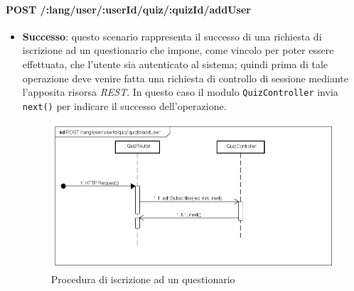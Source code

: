 \paragraph{POST /:lang/user/:userId/quiz/:quizId/addUser} %
\begin{itemize}
\item \textbf{Successo}: questo scenario rappresenta il successo di una richiesta di iscrizione ad un questionario che impone, come vincolo per poter essere effettuata, che l'utente sia autenticato al sistema; quindi prima di tale operazione deve venire fatta una richiesta di controllo di sessione mediante l'apposita risorsa \textit{REST}. In questo caso il modulo \texttt{QuizController} invia \texttt{next()} per indicare il successo dell'operazione.
\label{Procedura di iscrizione ad un questionario}
\begin{figure}[ht]
	\centering
	\includegraphics[scale=0.50]{UML/DiagrammiDiSequenza/Back-end/POST__lang_user_userId_quiz_quizId_addUser_success.png}
	\caption{Procedura di iscrizione ad un questionario}
\end{figure}
\FloatBarrier


\end{itemize}
